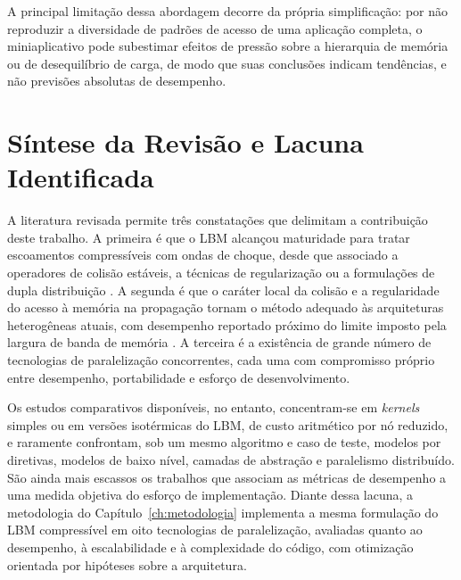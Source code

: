A principal limitação dessa abordagem decorre da própria simplificação: por não reproduzir a diversidade de padrões de acesso de uma aplicação completa, o miniaplicativo pode subestimar efeitos de pressão sobre a hierarquia de memória ou de desequilíbrio de carga, de modo que suas conclusões indicam tendências, e não previsões absolutas de desempenho.


\section{Síntese da Revisão e Lacuna Identificada}\label{sec:sintese-e-lacuna}

A literatura revisada permite três constatações que delimitam a contribuição deste trabalho.
A primeira é que o LBM alcançou maturidade para tratar escoamentos compressíveis com ondas de choque, desde que associado a operadores de colisão estáveis, a técnicas de regularização ou a formulações de dupla distribuição \parencite{Tran2022, Rathnayake2024, Guo2020}.
A segunda é que o caráter local da colisão e a regularidade do acesso à memória na propagação tornam o método adequado às arquiteturas heterogêneas atuais, com desempenho reportado próximo do limite imposto pela largura de banda de memória \parencite{Tomczak2021, Ma2023}.
A terceira é a existência de grande número de tecnologias de paralelização concorrentes, cada uma com compromisso próprio entre desempenho, portabilidade e esforço de desenvolvimento.

Os estudos comparativos disponíveis, no entanto, concentram-se em \textit{kernels} simples ou em versões isotérmicas do LBM, de custo aritmético por nó reduzido, e raramente confrontam, sob um mesmo algoritmo e caso de teste, modelos por diretivas, modelos de baixo nível, camadas de abstração e paralelismo distribuído.
São ainda mais escassos os trabalhos que associam as métricas de desempenho a uma medida objetiva do esforço de implementação.
Diante dessa lacuna, a metodologia do Capítulo~\ref{ch:metodologia} implementa a mesma formulação do LBM compressível em oito tecnologias de paralelização, avaliadas quanto ao desempenho, à escalabilidade e à complexidade do código, com otimização orientada por hipóteses sobre a arquitetura.
